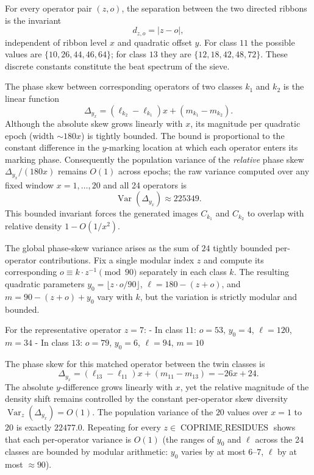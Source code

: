 \documentclass[11pt,a4paper]{article}
\begin{document}
For every operator pair \((z,o)\), the separation between the two directed ribbons is the invariant
\[
d_{z,o}=|z-o|,
\]
independent of ribbon level \(x\) and quadratic offset \(y\). For class $11$ the possible values are \(\{10,26,44,46,64\}\); for class $13$ they are \(\{12,18,42,48,72\}\). These discrete constants constitute the beat spectrum of the sieve.

The phase skew between corresponding operators of two classes \(k_1\) and \(k_2\) is the linear function
\[
\Delta_{y_x}=(\ell_{k_2}-\ell_{k_1})x+(m_{k_1}-m_{k_2}).
\]
Although the absolute skew grows linearly with \(x\), its magnitude per quadratic epoch (width \(\sim180x\)) is tightly bounded. The bound is proportional to the constant difference in the \(y\)-marking location at which each operator enters its marking phase. Consequently the population variance of the \emph{relative} phase skew \(\Delta_{y_x}/(180x)\) remains \(O(1)\) across epochs; the raw variance computed over any fixed window \(x=1,\dots,20\) and all 24 operators is
\[
\operatorname{Var}(\Delta_{y_x})\approx225349.
\]
This bounded invariant forces the generated images \(C_{k_1}\) and \(C_{k_2}\) to overlap with relative density \(1-O(1/x^2)\).

The global phase-skew variance arises as the sum of $24$ tightly bounded per-operator contributions. Fix a single modular index \(z\) and compute its corresponding \(o\equiv k\cdot z^{-1}\pmod{90}\) separately in each class \(k\). The resulting quadratic parameters \(y_0=\lfloor z\cdot o/90\rfloor\), \(\ell=180-(z+o)\), and \(m=90-(z+o)+y_0\) vary with \(k\), but the variation is strictly modular and bounded.

For the representative operator \(z=7\):
- In class $11$: \(o=53\), \(y_0=4\), \(\ell=120\), \(m=34\)
- In class $13$: \(o=79\), \(y_0=6\), \(\ell=94\), \(m=10\)

The phase skew for this matched operator between the twin classes is
\[
\Delta_{y_x}=(\ell_{13}-\ell_{11})x+(m_{11}-m_{13})=-26x+24.
\]
The absolute \(y\)-difference grows linearly with \(x\), yet the relative magnitude of the density shift remains controlled by the constant per-operator skew diversity \(\operatorname{Var}_z(\Delta_{y_x})=O(1)\). The population variance of the $20$ values over \(x=1\) to $20$ is exactly $22477.0$. Repeating for every \(z\in\operatorname{COPRIME\_RESIDUES}\) shows that each per-operator variance is \(O(1)\) (the ranges of \(y_0\) and \(\ell\) across the 24 classes are bounded by modular arithmetic: \(y_0\) varies by at most $6$--$7$, \(\ell\) by at most \(\approx90\)).
\end{document}
